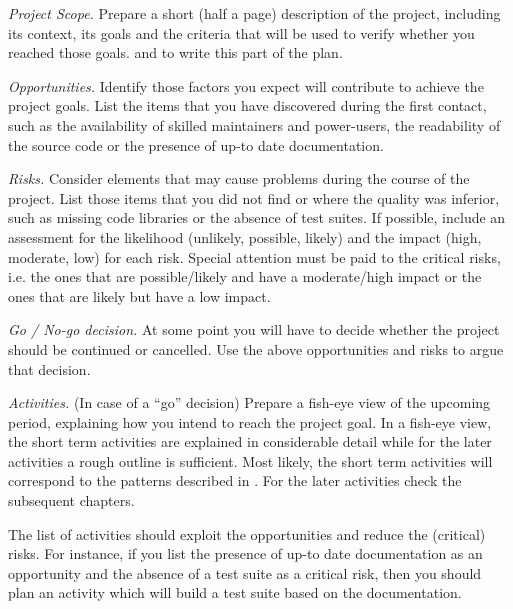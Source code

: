 \documentclass[a4paper,10pt,twoside]{book}
\begin{document}
\begin{bulletlist}
  \item \emph{Project Scope.}
Prepare a short (half a page) description of the project, including its context, its goals and the criteria that will be used to verify whether you reached those goals.  and  to write this part of the plan.

  \item \emph{Opportunities.}
Identify those factors you expect will contribute to achieve the project goals. List the items that you have discovered during the first contact, such as the availability of skilled maintainers and power-users, the readability of the source code or the presence of up-to date documentation.

  \item \emph{Risks.}
Consider elements that may cause problems during the course of the project. List those items that you did not find or where the quality was inferior, such as missing code libraries or the absence of test suites. If possible, include an assessment for the likelihood (unlikely, possible, likely) and the impact (high, moderate, low) for each risk. Special attention must be paid to the critical risks, i.e. the ones that are possible/likely and have a moderate/high impact or the ones that are likely but have a low impact.

  \item \emph{Go / No-go decision.}
At some point you will have to decide whether the project should be continued or cancelled. Use the above opportunities and risks to argue that decision.

  \item \emph{Activities.}
(In case of a ``go'' decision) Prepare a fish-eye view of the upcoming period, explaining how you intend to reach the project goal. In a fish-eye view, the short term activities are explained in considerable detail while for the later activities a rough outline is sufficient. Most likely, the short term activities will correspond to the patterns described in . For the later activities check the subsequent chapters.

The list of activities should exploit the opportunities and reduce the (critical) risks. For instance, if you list the presence of up-to date documentation as an opportunity and the absence of a test suite as a critical risk, then you should plan an activity which will build a test suite based on the documentation.

\end{bulletlist}
\end{document}
